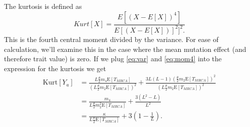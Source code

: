 \documentclass{article}
\newcommand{\T}{\frac{\theta}{2}}
\newcommand{\E}{\mathrm{E}}
\newcommand{\Kurt}{\mathrm{Kurt}}
\begin{document}
The kurtosis is defined as
\begin{equation*}
  Kurt[X]=\frac{E[(X-E[X])^4]}{E[(X-E[X])]^2]^2.}
\end{equation*}
This is the fourth central moment divided by the variance. For ease of
calculation, we'll examine this in the case where the mean mutation effect (and
therefore trait value) is zero. If we plug \eqref{eq:var} and \eqref{eq:mom4}
into the expression for the kurtosis we get
\begin{align*}
  \Kurt[Y_a] &= \frac{L\T m_4 \E[T_{MRCA}]}{\left(L\T m_2 \E[T_{MRCA}]\right)^2} +
  \frac{3L(L-1)\left( \T m_2  \E[T_{MRCA}]\right)^2}{\left(L\T m_2 \E[T_{MRCA}]\right)^2} \nonumber \\
  &= \frac{m_4}{L\T m_2^2\E[T_{MRCA}]} + \frac{3(L^2-L)}{L^2} \nonumber \\
  &= \frac{\kappa}{L\T \E[T_{MRCA}]} + 3\left( 1 - \frac{1}{L} \right).
\end{align*}
\end{document}
